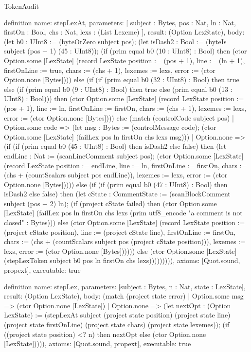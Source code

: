 \begin{lexlean}{TokenAudit}
\begin{semanticmodule}
definition{
  name: stepLexAt,
  parameters: [
    subject : Bytes,
    pos : Nat,
    ln : Nat,
    firstOn : Bool,
    chs : Nat,
    lexs : (List Lexeme)
  ],
  result: (Option LexState),
  body: (let b0 : UInt8 := (byteOrZero subject pos); (let isDash2 : Bool := (byteIs subject (pos + 1) (45 : UInt8)); (if (prim equal b0 (10 : UInt8) : Bool) then (ctor Option.some [LexState] (record LexState {position := (pos + 1), line := (ln + 1), firstOnLine := true, chars := (chs + 1), lexemes := lexs, error := (ctor Option.none [Bytes])})) else (if (if (prim equal b0 (32 : UInt8) : Bool) then true else (if (prim equal b0 (9 : UInt8) : Bool) then true else (prim equal b0 (13 : UInt8) : Bool))) then (ctor Option.some [LexState] (record LexState {position := (pos + 1), line := ln, firstOnLine := firstOn, chars := (chs + 1), lexemes := lexs, error := (ctor Option.none [Bytes])})) else (match (controlCode subject pos)
    | Option.some code => (let msg : Bytes := (controlMessage code); (ctor Option.some [LexState] (failLex pos ln firstOn chs lexs msg)))
    | Option.none => (if (if (prim equal b0 (45 : UInt8) : Bool) then isDash2 else false) then (let endLine : Nat := (scanLineComment subject pos); (ctor Option.some [LexState] (record LexState {position := endLine, line := ln, firstOnLine := firstOn, chars := (chs + (countScalars subject pos endLine)), lexemes := lexs, error := (ctor Option.none [Bytes])}))) else (if (if (prim equal b0 (47 : UInt8) : Bool) then isDash2 else false) then (let cState : CommentState := (scanBlockComment subject (pos + 2) ln); (if (project cState failed) then (ctor Option.some [LexState] (failLex pos ln firstOn chs lexs (prim utf8_encode "a comment is not closed" : Bytes))) else (ctor Option.some [LexState] (record LexState {position := (project cState position), line := (project cState line), firstOnLine := firstOn, chars := (chs + (countScalars subject pos (project cState position))), lexemes := lexs, error := (ctor Option.none [Bytes])})))) else (ctor Option.some [LexState] (stepLexToken subject b0 pos ln firstOn chs lexs))))))))),
  axioms: [Quot.sound, propext],
  executable: true
}

definition{
  name: stepLex,
  parameters: [subject : Bytes, n : Nat, state : LexState],
  result: (Option LexState),
  body: (match (project state error)
    | Option.some msg => (ctor Option.none [LexState])
    | Option.none => (let nextOpt : (Option LexState) := (stepLexAt subject (project state position) (project state line) (project state firstOnLine) (project state chars) (project state lexemes)); (if ((project state position) <? n) then nextOpt else (ctor Option.none [LexState])))),
  axioms: [Quot.sound, propext],
  executable: true
}


\end{semanticmodule}
\end{lexlean}

